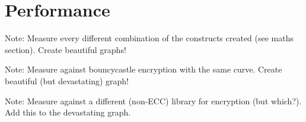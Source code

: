 \section{Performance}

Note: Measure every different combination of the constructs created (see maths section). Create beautiful graphs!

Note: Measure against bouncycastle encryption with the same curve. Create beautiful (but devastating) graph!

Note: Measure against a different (non-ECC) library for encryption (but which?). Add this to the devastating graph.